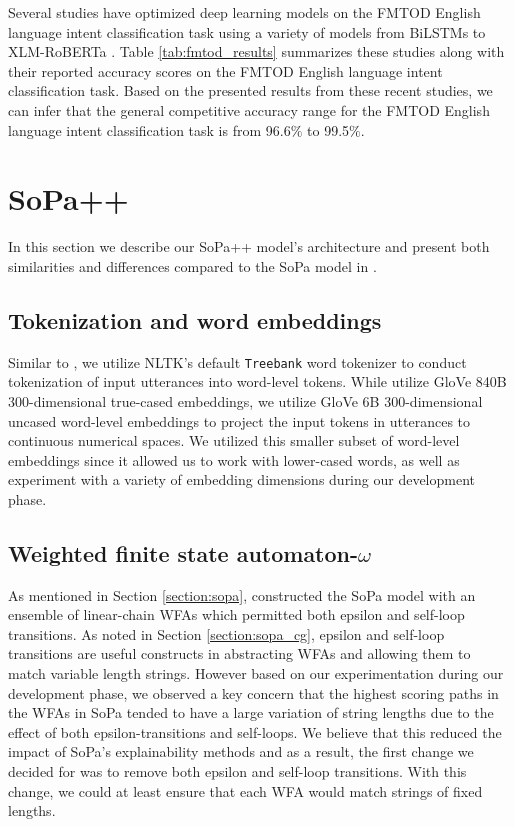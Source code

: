 Several studies have optimized deep learning models on the FMTOD English
language intent classification task using a variety of models from BiLSTMs to
XLM-RoBERTa
\citep{schuster-etal-2019-cross-lingual,zhang2019joint,zhang-etal-2020-intent}.
Table \ref{tab:fmtod_results} summarizes these studies along with their reported
accuracy scores on the FMTOD English language intent classification task. Based
on the presented results from these recent studies, we can infer that the
general competitive accuracy range for the FMTOD English language intent
classification task is from 96.6$\%$ to 99.5$\%$.

\section{SoPa++}

In this section we describe our SoPa++ model's architecture and present both
similarities and differences compared to the SoPa model in
\citet{schwartz2018sopa}.

\subsection{Tokenization and word embeddings}

Similar to \citet{schwartz2018sopa}, we utilize NLTK's default \texttt{Treebank}
word tokenizer \citep{bird-loper-2004-nltk} to conduct tokenization of input
utterances into word-level tokens. While \citet{schwartz2018sopa} utilize GloVe
840B 300-dimensional true-cased embeddings, we utilize GloVe 6B 300-dimensional
uncased word-level embeddings \citep{pennington2014glove} to project the input
tokens in utterances to continuous numerical spaces. We utilized this smaller
subset of word-level embeddings since it allowed us to work with lower-cased
words, as well as experiment with a variety of embedding dimensions during our
development phase.

\subsection{Weighted finite state automaton-$\omega$}

As mentioned in Section \ref{section:sopa}, \citet{schwartz2018sopa}
constructed the SoPa model with an ensemble of linear-chain WFAs which permitted
both epsilon and self-loop transitions. As noted in Section
\ref{section:sopa_cg}, epsilon and self-loop transitions are useful
constructs in abstracting WFAs and allowing them to match variable length
strings. However based on our experimentation during our development phase, we
observed a key concern that the highest scoring paths in the WFAs in SoPa tended
to have a large variation of string lengths due to the effect of both
epsilon-transitions and self-loops. We believe that this reduced the impact of
SoPa's explainability methods and as a result, the first change we decided for
was to remove both epsilon and self-loop transitions. With this change, we could
at least ensure that each WFA would match strings of fixed lengths.


